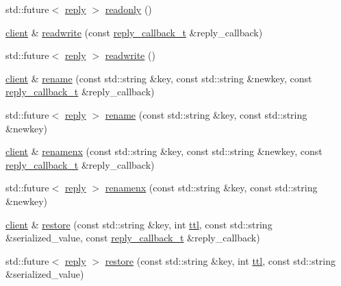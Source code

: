 \begin{DoxyCompactItemize}
\item 
std\+::future$<$ \hyperlink{classcpp__redis_1_1reply}{reply} $>$ \hyperlink{classcpp__redis_1_1client_acbf4ef53964a7e451793c17b9ac103ee}{readonly} ()
\item 
\hyperlink{classcpp__redis_1_1client}{client} \& \hyperlink{classcpp__redis_1_1client_a0a9bfe5e6ec4ccbaf2b633dedc55a581}{readwrite} (const \hyperlink{classcpp__redis_1_1client_a061a1140d36d2eaeda82b09a0bb3f9f2}{reply\+\_\+callback\+\_\+t} \&reply\+\_\+callback)
\item 
std\+::future$<$ \hyperlink{classcpp__redis_1_1reply}{reply} $>$ \hyperlink{classcpp__redis_1_1client_afc139fc098703cf5ec661fedc0552184}{readwrite} ()
\item 
\hyperlink{classcpp__redis_1_1client}{client} \& \hyperlink{classcpp__redis_1_1client_abbc2bb4b988d5e3e539d65d3eb9f511f}{rename} (const std\+::string \&key, const std\+::string \&newkey, const \hyperlink{classcpp__redis_1_1client_a061a1140d36d2eaeda82b09a0bb3f9f2}{reply\+\_\+callback\+\_\+t} \&reply\+\_\+callback)
\item 
std\+::future$<$ \hyperlink{classcpp__redis_1_1reply}{reply} $>$ \hyperlink{classcpp__redis_1_1client_a6a4ab4ac68aa92560569db6683bb591c}{rename} (const std\+::string \&key, const std\+::string \&newkey)
\item 
\hyperlink{classcpp__redis_1_1client}{client} \& \hyperlink{classcpp__redis_1_1client_a80b0abd5548ae3bfe22ed008767689c0}{renamenx} (const std\+::string \&key, const std\+::string \&newkey, const \hyperlink{classcpp__redis_1_1client_a061a1140d36d2eaeda82b09a0bb3f9f2}{reply\+\_\+callback\+\_\+t} \&reply\+\_\+callback)
\item 
std\+::future$<$ \hyperlink{classcpp__redis_1_1reply}{reply} $>$ \hyperlink{classcpp__redis_1_1client_a1b5110b73c9561e5b235317fa03ee4bb}{renamenx} (const std\+::string \&key, const std\+::string \&newkey)
\item 
\hyperlink{classcpp__redis_1_1client}{client} \& \hyperlink{classcpp__redis_1_1client_a3598f781ae048b03edcdb07e8d2c0f41}{restore} (const std\+::string \&key, int \hyperlink{classcpp__redis_1_1client_a667bb7a6ead9c8cdaba534033a467367}{ttl}, const std\+::string \&serialized\+\_\+value, const \hyperlink{classcpp__redis_1_1client_a061a1140d36d2eaeda82b09a0bb3f9f2}{reply\+\_\+callback\+\_\+t} \&reply\+\_\+callback)
\item 
std\+::future$<$ \hyperlink{classcpp__redis_1_1reply}{reply} $>$ \hyperlink{classcpp__redis_1_1client_a5b7a7d7de93268198f27cd21f63ba337}{restore} (const std\+::string \&key, int \hyperlink{classcpp__redis_1_1client_a667bb7a6ead9c8cdaba534033a467367}{ttl}, const std\+::string \&serialized\+\_\+value)

\end{DoxyCompactItemize}
